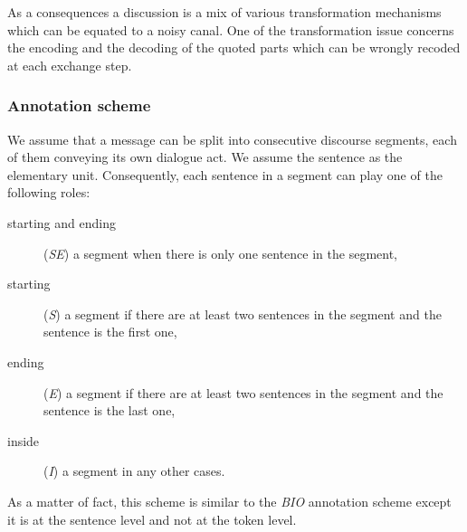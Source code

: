 As a consequences a discussion is a mix of various transformation mechanisms which can be equated to a noisy canal. 
%
One of the transformation issue concerns the encoding and the decoding of the quoted parts which can be wrongly recoded at each exchange step.











\subsubsection{Annotation scheme}
\label{}


We assume that a message can be split into %
 consecutive discourse segments, each of them conveying its own dialogue act.
We assume the sentence as the elementary unit.
Consequently, each sentence in a segment can play one of the following roles: 
\begin{description}
\item [starting and ending] (\textit{SE}) a segment when there is only one sentence in the segment, 
\item [starting] (\textit{S}) a segment if there are at least two sentences in the segment and the sentence is the first one, 
\item [ending] (\textit{E}) a segment if there are at least two sentences in the segment and the sentence is the last one, 
\item [inside] (\textit{I}) a segment in any other cases.
\end{description}
%
As a matter of fact, this scheme is similar to the \textit{BIO} annotation scheme except it is at the sentence level and not at the token level.






